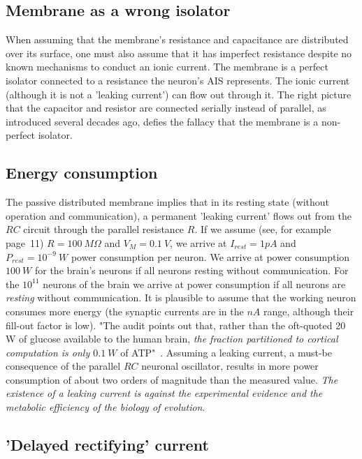 \subsection{Membrane as a wrong isolator\label{sec:Physiology-Wrong isolator}}

When assuming that the membrane's resistance and capacitance are distributed over its surface,
one must also assume that it has imperfect resistance despite 
no known mechanisms to conduct an ionic current. The membrane is a perfect isolator
connected to a resistance the neuron's 
AIS
 represents. The ionic current
(although it is not a 'leaking current') can flow out through it. The right picture
that the capacitor and resistor are connected serially instead of parallel, as
introduced several decades ago, defies the fallacy that the membrane is a non-perfect isolator.

\subsection{Energy consumption\label{subsec:EnergyConsumption}}

The passive distributed membrane implies that in its resting state (without operation and communication), a permanent 'leaking current' flows out from the $RC$ circuit through the 
parallel resistance $R$. If we assume (see, for example~\cite{KochBiophysics:1999} page~11) $R=100\ M\Omega$ 
and $V_M=0.1~V$, we arrive at $I_{rest}=1pA$ and $P_{rest}=10^{-9}~W$ power consumption per neuron. 
We arrive at power consumption $100\ W$ for the brain's neurons if all neurons resting without communication.
For the $10^{11}$ neurons of the brain
we arrive at  power consumption if all neurons are  \textit{resting} without communication.
It is plausible to assume that the working neuron consumes more energy (the synaptic currents are in the $nA$ range, although their fill-out factor is low).
"The audit points out that, rather than the oft-quoted 20 W of glucose available to the human brain, \textit{the fraction partitioned to cortical computation is only $0.1~W$} of ATP"~\cite{EnergyNeuralCommunication:2021}.
Assuming a leaking current, a must-be consequence of the parallel  $RC$ neuronal oscillator, results in more power consumption of about two orders of magnitude than the measured value.
\textit{The existence of a leaking current is against the experimental evidence and 
the metabolic efficiency of the biology of evolution}. 


\subsection{'Delayed rectifying' current\label{sec:Physiology-DelayedCurrent}}

